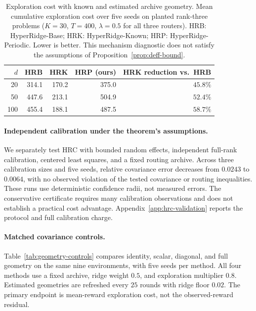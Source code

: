\documentclass{article} %
\begin{document}
\begin{table}[H]
\centering
\small
\caption{Exploration cost with known and estimated archive geometry.
Mean cumulative exploration cost over five seeds on planted rank-three
problems ($K=30$, $T=400$, $\lambda=0.5$ for all three routers).
HRB: HyperRidge-Base; HRK: HyperRidge-Known; HRP: HyperRidge-Periodic.
Lower is better. This mechanism diagnostic does not satisfy the assumptions
of Proposition~\ref{prop:deff-bound}.}
\label{tab:hyper-diagnostic}
\begin{tabular}{rrrrr}
\toprule
$d$ & HRB & HRK & HRP (ours) & HRK reduction vs.\ HRB \\
\midrule
20  & 314.1 & 170.2 & 375.0 & $45.8\%$ \\
50  & 447.6 & 213.1 & 504.9 & $52.4\%$ \\
100 & 455.4 & 188.1 & 487.5 & $58.7\%$ \\
\bottomrule
\end{tabular}

\end{table}

\paragraph{Independent calibration under the theorem's assumptions.}
We separately test HRC with bounded random effects, independent full-rank
calibration, centered least squares, and a fixed routing archive.
Across three calibration sizes and five seeds, relative covariance error
decreases from $0.0243$ to $0.0064$, with no observed violation of the
tested covariance or routing inequalities. These runs use deterministic
confidence radii, not measured errors. The conservative certificate requires
many calibration observations and does not establish a practical cost
advantage. Appendix~\ref{app:hrc-validation} reports the protocol and full
calibration charge.

\paragraph{Matched covariance controls.}
Table~\ref{tab:geometry-controls} compares identity, scalar, diagonal, and
full geometry on the same nine environments, with five seeds per method.
All four methods use a fixed archive, ridge weight $0.5$, and exploration
multiplier $0.8$. Estimated geometries are refreshed every $25$ rounds with
ridge floor $0.02$. The primary endpoint is mean-reward exploration cost,
not the observed-reward residual.
\end{document}
